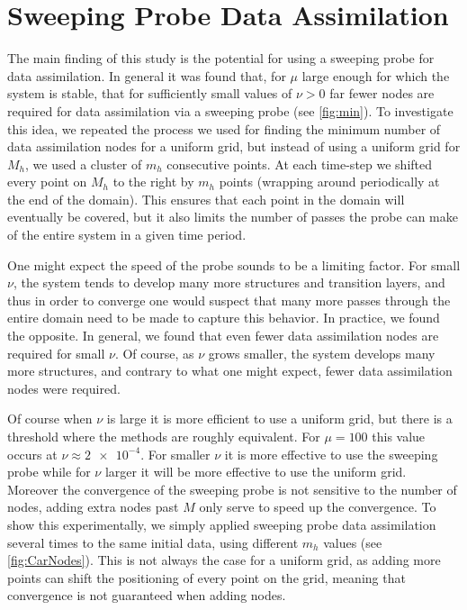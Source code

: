\documentclass[12pt]{amsart}
\theoremstyle{plain}
\theoremstyle{definition}
\theoremstyle{remark}
\numberwithin{equation}{section} %
\numberwithin{figure}{section}   %
\begin{document}
\section{Sweeping Probe Data Assimilation}\label{secNeatSection}
\noindent
The main finding of this study is the potential for using a sweeping probe for data assimilation. In general it was found that, for $\mu$ large enough for which the system is stable, that for sufficiently small values of $\nu >0$ far fewer nodes are required for data assimilation via a sweeping probe (see \cref{fig:min}). To investigate this idea, we repeated the process we used for finding the minimum number of data assimilation nodes for a uniform grid, but instead of using a uniform grid for $M_h$, we used a cluster of $m_h$ consecutive points. At each time-step we shifted every point on $M_h$ to the right by $m_h$ points (wrapping around periodically at the end of the domain). This ensures that each point in the domain will eventually be covered, but it also limits the number of passes the probe can make of the entire system in a given time period. 

One might expect the speed of the probe sounds to be a limiting factor. For small $\nu$, the system tends to develop many more structures and transition layers, and thus in order to converge one would suspect that many more passes through the entire domain need to be made to capture this behavior. In practice, we found the opposite. In general, we found that even fewer data assimilation nodes are required for small $\nu$. Of course, as $\nu$ grows smaller, the system develops many more structures, and contrary to what one might expect, fewer data assimilation nodes were required.

Of course when $\nu$ is large it is more efficient to use a uniform grid, but there is a threshold where the methods are roughly equivalent. For $\mu =100$ this value occurs at $\nu \approx \num{2e-4}$. For smaller $\nu$ it is more effective to use the sweeping probe while for $\nu$ larger it will be more effective to use the uniform grid. Moreover the convergence of the sweeping probe is not sensitive to the number of nodes, adding extra nodes past $M$ only serve to speed up the convergence. To show this experimentally, we simply applied sweeping probe data assimilation several times to the same initial data, using different $m_h$ values (see \cref{fig:CarNodes}). This is not always the case for a uniform grid, as adding more points can shift the positioning of every point on the grid, meaning that convergence is not guaranteed when adding nodes.
\end{document}
